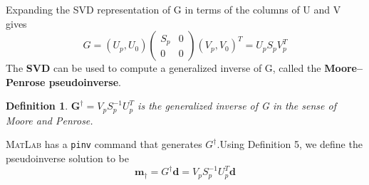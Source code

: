 \documentclass[a4paper]{article}
\newtheorem{definition}[theorem]{Definition}
\newcommand{\tmmathbf}[1]{\ensuremath{\boldsymbol{#1}}}
\newcommand{\tmstrong}[1]{\textbf{#1}}
\begin{document}
Expanding the SVD representation of G in terms of the columns of U and V gives
\begin{equation}
  G = \left( U_p, U_0 \right) \left(\begin{array}{cc}
    S_p  & 0\\
    0 & 0
  \end{array}\right) \left( V_p, V_0 \right)^T = U_p S_p V_p^T
\end{equation}
The {\tmstrong{SVD}} can be used to compute a generalized inverse of G, called
the {\tmstrong{Moore--Penrose pseudoinverse}}.

\begin{definition}
  $\tmmathbf{G}^{\dagger} = V_p S_p^{- 1} U_p^T$ is the generalized inverse of
  G in the sense of Moore and Penrose.
\end{definition}

\textsc{MatLab} has a \verb$pinv$ command that generates $G^{\dagger}$.Using
Definition 5, we define the pseudoinverse solution to be
\begin{equation}
  \tmmathbf{m}_{\dagger} = G^{\dagger} \tmmathbf{d}= V_p S_p^{- 1} U_p^T
  \tmmathbf{d}
\end{equation}
\end{document}
